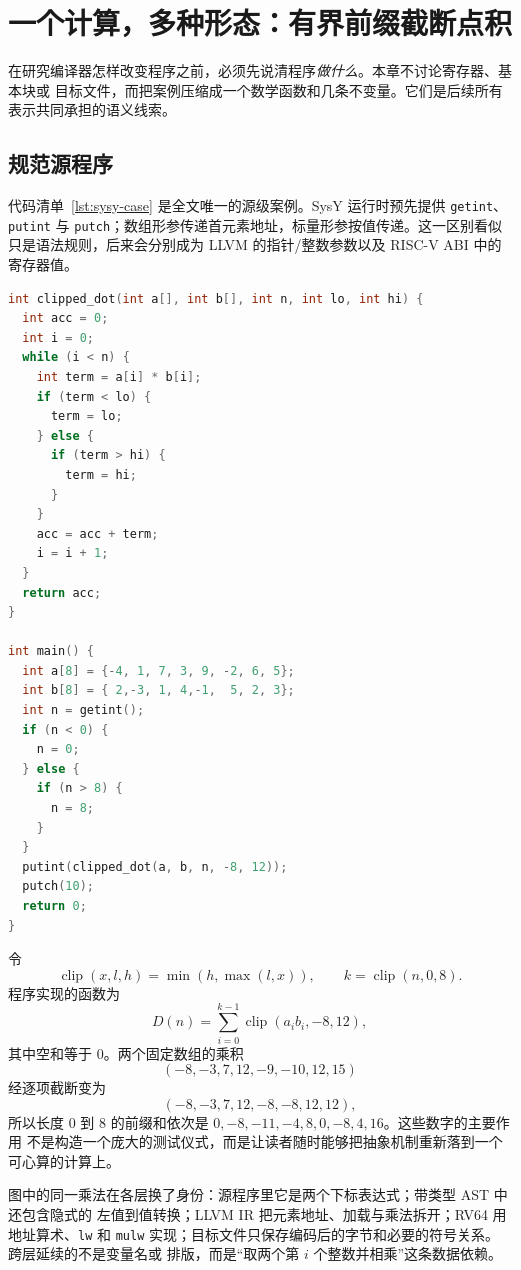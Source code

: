 \section{一个计算，多种形态：有界前缀截断点积}
\label{sec:case-study}

在研究编译器怎样改变程序之前，必须先说清程序\emph{做什么}。本章不讨论寄存器、基本块或
目标文件，而把案例压缩成一个数学函数和几条不变量。它们是后续所有表示共同承担的语义线索。

\subsection{规范源程序}

代码清单~\ref{lst:sysy-case} 是全文唯一的源级案例。SysY 运行时预先提供 \texttt{getint}、
\texttt{putint} 与 \texttt{putch}；数组形参传递首元素地址，标量形参按值传递。这一区别看似
只是语法规则，后来会分别成为 LLVM 的指针/整数参数以及 RISC-V ABI 中的寄存器值。

\begin{lstlisting}[language=C,caption={规范性 SysY 案例。},label={lst:sysy-case}]
int clipped_dot(int a[], int b[], int n, int lo, int hi) {
  int acc = 0;
  int i = 0;
  while (i < n) {
    int term = a[i] * b[i];
    if (term < lo) {
      term = lo;
    } else {
      if (term > hi) {
        term = hi;
      }
    }
    acc = acc + term;
    i = i + 1;
  }
  return acc;
}

int main() {
  int a[8] = {-4, 1, 7, 3, 9, -2, 6, 5};
  int b[8] = { 2,-3, 1, 4,-1,  5, 2, 3};
  int n = getint();
  if (n < 0) {
    n = 0;
  } else {
    if (n > 8) {
      n = 8;
    }
  }
  putint(clipped_dot(a, b, n, -8, 12));
  putch(10);
  return 0;
}
\end{lstlisting}

令
\[
  \operatorname{clip}(x,l,h)=\min(h,\max(l,x)),\qquad
  k=\operatorname{clip}(n,0,8).
\]
程序实现的函数为
\begin{equation}
  D(n)=\sum_{i=0}^{k-1}\operatorname{clip}(a_i b_i,-8,12),
  \label{eq:clipped-dot}
\end{equation}
其中空和等于 0。两个固定数组的乘积
\[
(-8,-3,7,12,-9,-10,12,15)
\]
经逐项截断变为
\[
(-8,-3,7,12,-8,-8,12,12),
\]
所以长度 $0$ 到 $8$ 的前缀和依次是 $0,-8,-11,-4,8,0,-8,4,16$。这些数字的主要作用
不是构造一个庞大的测试仪式，而是让读者随时能够把抽象机制重新落到一个可心算的计算上。



图中的同一乘法在各层换了身份：源程序里它是两个下标表达式；带类型 AST 中还包含隐式的
左值到值转换；LLVM IR 把元素地址、加载与乘法拆开；RV64 用地址算术、\texttt{lw} 和
\texttt{mulw} 实现；目标文件只保存编码后的字节和必要的符号关系。跨层延续的不是变量名或
排版，而是“取两个第 $i$ 个整数并相乘”这条数据依赖。

